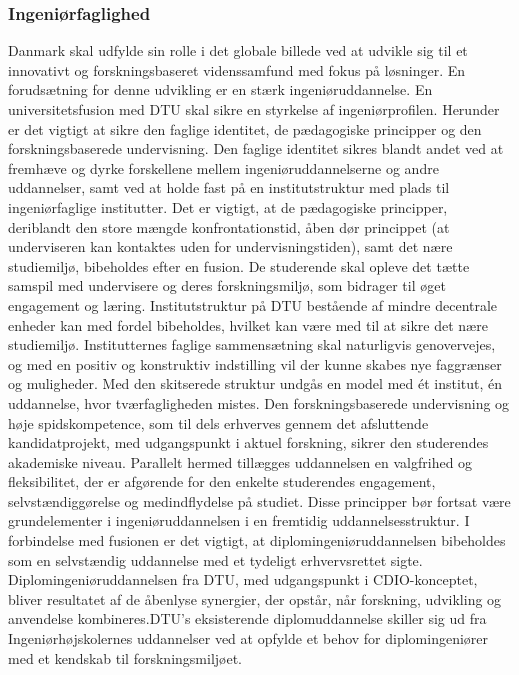 \subsubsection{Ingeniørfaglighed}
Danmark skal udfylde sin rolle i det globale billede ved at udvikle sig til et innovativt og forskningsbaseret
videnssamfund med fokus på løsninger. En forudsætning for denne udvikling er en stærk ingeniøruddannelse. En
universitetsfusion med DTU skal sikre en styrkelse af ingeniørprofilen. Herunder er det vigtigt at sikre den faglige
identitet, de pædagogiske principper og den forskningsbaserede undervisning.
Den faglige identitet sikres blandt andet ved at fremhæve og dyrke forskellene mellem ingeniøruddannelserne og andre
uddannelser, samt ved at holde fast på en institutstruktur med plads til ingeniørfaglige institutter.
Det er vigtigt, at de pædagogiske principper, deriblandt den store mængde konfrontationstid, åben dør princippet (at
underviseren kan kontaktes uden for undervisningstiden), samt det nære studiemiljø, bibeholdes efter en fusion. De
studerende skal opleve det tætte samspil med undervisere og deres forskningsmiljø, som bidrager til øget engagement
og læring. Institutstruktur på DTU bestående af mindre decentrale enheder kan med fordel bibeholdes, hvilket kan være
med til at sikre det nære studiemiljø. Institutternes faglige sammensætning skal naturligvis genovervejes, og med en
positiv og konstruktiv indstilling vil der kunne skabes nye faggrænser og muligheder. Med den skitserede struktur
undgås en model med ét institut, én uddannelse, hvor tværfagligheden mistes.
Den forskningsbaserede undervisning og høje spidskompetence, som til dels erhverves gennem det afsluttende
kandidatprojekt, med udgangspunkt i aktuel forskning, sikrer den studerendes akademiske niveau. Parallelt hermed
tillægges uddannelsen en valgfrihed og fleksibilitet, der er afgørende for den enkelte studerendes engagement,
selvstændiggørelse og medindflydelse på studiet. Disse principper bør fortsat være grundelementer i
ingeniøruddannelsen i en fremtidig uddannelsesstruktur.
I forbindelse med fusionen er det vigtigt, at diplomingeniøruddannelsen bibeholdes som en selvstændig uddannelse med
et tydeligt erhvervsrettet sigte. Diplomingeniøruddannelsen fra DTU, med udgangspunkt i CDIO-konceptet, bliver
resultatet af de åbenlyse synergier, der opstår, når forskning, udvikling og anvendelse kombineres.DTU’s eksisterende
diplomuddannelse skiller sig ud fra Ingeniørhøjskolernes uddannelser ved at opfylde et behov for diplomingeniører med
et kendskab til forskningsmiljøet.
